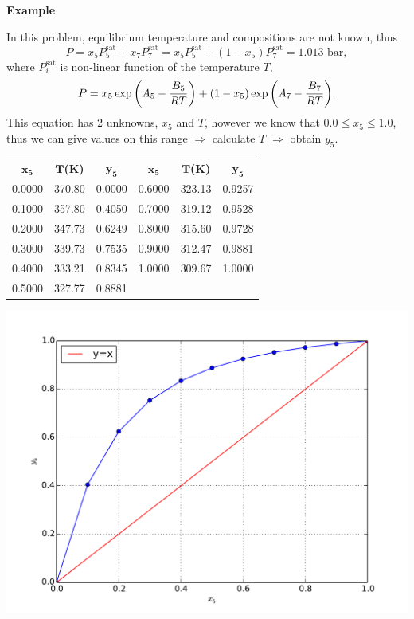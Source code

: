\begin{MyExample}{\begin{center}{\bf Example}\end{center}}
     In this problem, equilibrium temperature and compositions are not known, thus
          \begin{displaymath}
              P = x_{5}P_{5}^{\text{sat}} + x_{7}P_{7}^{\text{sat}} = x_{5}P_{5}^{\text{sat}} + \left(1 - x_{5}\right)P_{7}^{\text{sat}} = 1.013\text{ bar},
          \end{displaymath}
          where $P_{i}^{\text{sat}}$ is non-linear function of the temperature $T$, \ie
          \begin{displaymath}
              P = x_{5}\exp{\left(A_{5} - \displaystyle\frac{B_{5}}{RT}\right)} + \left(1 - x_{5}\right)\exp{\left(A_{7} - \displaystyle\frac{B_{7}}{RT}\right)}.
          \end{displaymath}
          This equation has 2 unknowns, $x_{5}$ and $T$, however we know that $0.0\leq x_{5} \leq 1.0$, thus we can give values on this range $\Rightarrow$ calculate $T$  $\Rightarrow$  obtain $y_{5}$.
          \begin{center}
              \begin{tabular}{ c c c | c c c}
                  $\mathbf{x_{5}}$ & $\mathbf{T}${\bf(K)}  & $\mathbf{y_{5}}$ & $\mathbf{x_{5}}$ & $\mathbf{T}${\bf(K)}  & $\mathbf{y_{5}}$ \\
                    0.0000          & 370.80                & 0.0000         & 0.6000          & 323.13                & 0.9257          \\
                    0.1000          & 357.80                & 0.4050         & 0.7000          & 319.12                & 0.9528          \\
                    0.2000          & 347.73                & 0.6249         & 0.8000          & 315.60                & 0.9728          \\
                    0.3000          & 339.73                & 0.7535         & 0.9000          & 312.47                & 0.9881          \\
                    0.4000          & 333.21                & 0.8345         & 1.0000          & 309.67                & 1.0000          \\
                    0.5000          & 327.77                & 0.8881         &                 &                       &                 
              \end{tabular}
           \end{center}
           \medskip
             \hbox{\includegraphics[width=.5\linewidth,clip]{./Figs/Mod4Ex2a}
}
\end{MyExample}
